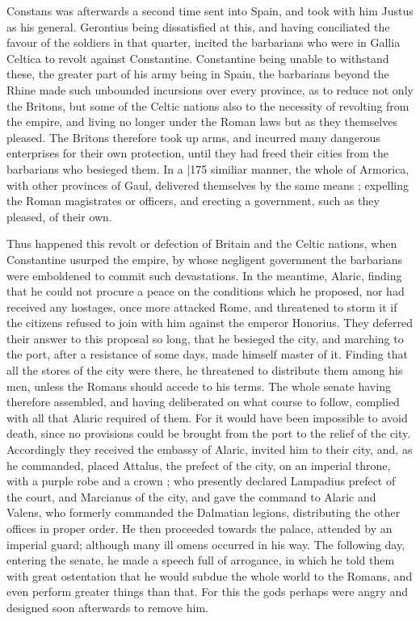 Constans was afterwards a second time sent into Spain, and took with him Justus as his general. Gerontius being dissatisfied at this, and having conciliated the favour of the soldiers in that quarter, incited the barbarians who were in Gallia Celtica to revolt against Constantine. Constantine being unable to withstand these, the greater part of his army being in Spain, the barbarians beyond the Rhine made such unbounded incursions over every province, as to reduce not only the Britons, but some of the Celtic nations also to the necessity of revolting from the empire, and living no longer under the Roman laws but as they themselves pleased. The Britons therefore took up arms, and incurred many dangerous enterprises for their own protection, until they had freed their cities from the barbarians who besieged them. In a
|175 similiar manner, the whole of Armorica, with other provinces of Gaul, delivered themselves by the same means ; expelling the Roman magistrates or officers, and erecting a government, such as they pleased, of their own.

Thus happened this revolt or defection of Britain and the Celtic nations, when Constantine usurped the empire, by whose negligent government the barbarians were emboldened to commit such devastations. In the meantime, Alaric, finding that he could not procure a peace on the conditions which he proposed, nor had received any hostages, once more attacked Rome, and threatened to storm it if the citizens refused to join with him against the emperor Honorius. They deferred their answer to this proposal so long, that he besieged the city, and marching to the port, after a resistance of some days, made himself master of it. Finding that all the stores of the city were there, he threatened to distribute them among his men, unless the Romans should accede to his terms. The whole senate having therefore assembled, and having deliberated on what course to follow, complied with all that Alaric required of them. For it would have been impossible to avoid death, since no provisions could be brought from the port to the relief of the city. Accordingly they received the embassy of Alaric, invited him to their city, and, as he commanded, placed Attalus, the prefect of the city, on an imperial throne, with a purple robe and a crown ; who presently declared Lampadius prefect of the court, and Marcianus of the city, and gave the command to Alaric and Valens, who formerly commanded the Dalmatian legions, distributing the other offices in proper order. He then proceeded towards the palace, attended by an imperial guard; although many ill omens occurred in his way. The following day, entering the senate, he made a speech full of arrogance, in which he told them with great ostentation that he would subdue the whole world to the Romans, and even perform greater things than that. For this the gods perhaps were angry and designed soon afterwards to remove him.


